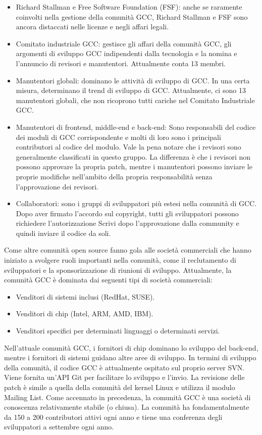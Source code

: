 \documentclass[12pt,a4paper]{report}
\begin{document}
\begin{itemize}
\item Richard Stallman e Free Software Foundation (FSF): anche se raramente coinvolti nella gestione della comunità GCC, Richard Stallman e FSF sono ancora distaccati nelle licenze e negli affari legali.
\item Comitato industriale GCC: gestisce gli affari della comunità GCC, gli argomenti di sviluppo GCC indipendenti dalla tecnologia e la nomina e l'annuncio di revisori e manutentori. Attualmente conta 13 membri.
\item Manutentori globali: dominano le attività di sviluppo di GCC. In una certa misura, determinano il trend di sviluppo di GCC. Attualmente, ci sono 13 manutentori globali, che non ricoprono tutti cariche nel Comitato Industriale GCC.
\item Manutentori di frontend, middle-end e back-end: Sono responsabili del codice dei moduli di GCC corrispondente e molti di loro sono i principali contributori al codice del modulo. Vale la pena notare che i revisori sono generalmente classificati in questo gruppo. La differenza è che i revisori non possono approvare la propria patch, mentre i manutentori possono inviare le proprie modifiche nell'ambito della propria responsabilità senza l'approvazione dei revisori.
\item Collaboratori: sono i gruppi di sviluppatori più estesi nella comunità di GCC. Dopo aver firmato l'accordo sul copyright, tutti gli sviluppatori possono richiedere l'autorizzazione Scrivi dopo l'approvazione dalla community e quindi inviare il codice da soli.
\end{itemize}


Come altre comunità open source fanno gola alle società commerciali che hanno iniziato a svolgere ruoli importanti nella comunità, come il reclutamento di sviluppatori e la sponsorizzazione di riunioni di sviluppo. Attualmente, la comunità GCC è dominata dai seguenti tipi di società commerciali:
\begin{itemize}
\item Venditori di sistemi inclusi (RedHat, SUSE).
\item Venditori di chip (Intel, ARM, AMD, IBM).
\item Venditori specifici per determinati linguaggi o determinati servizi.
\end{itemize}

Nell'attuale comunità GCC, i fornitori di chip dominano lo sviluppo del back-end, mentre i fornitori di sistemi guidano altre aree di sviluppo. In termini di sviluppo della comunità, il codice GCC è attualmente ospitato sul proprio server SVN. Viene fornita un'API Git per facilitare lo sviluppo e l'invio. La revisione delle patch è simile a quella della comunità del kernel Linux e utilizza il modulo Mailing List. Come accennato in precedenza, la comunità GCC è una società di conoscenza relativamente stabile (o chiusa). La comunità ha fondamentalmente da 150 a 200 contributori attivi ogni anno e tiene una conferenza degli sviluppatori a settembre ogni anno. 
\end{document}
